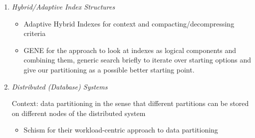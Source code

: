 \begin{enumerate}
\item \emph{Hybrid/Adaptive Index Structures}

    \begin{itemize}
    \item Adaptive Hybrid Indexes \cite{Anneser2022} for context and compacting/decompressing criteria
    \item GENE \cite{Dittrich2021} for the approach to look at indexes as logical components and combining them, generic
    search briefly to iterate over starting options and give our partitioning as a possible better starting point.
    \end{itemize}

\item \emph{Distributed (Database) Systems}

    Context: data partitioning in the sense that different partitions can be stored on different nodes of the distributed system
    \begin{itemize}
    \item Schism \cite{Curino2010} for their workload-centric approach to data partitioning
    \end{itemize}
\end{enumerate}
